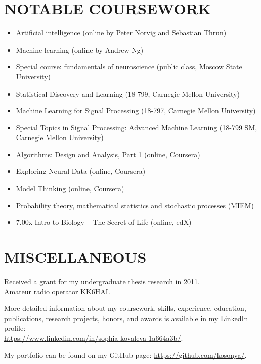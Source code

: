 \documentclass{res}
\begin{document}
\begin{resume}
\section{NOTABLE COURSEWORK}          
 
\begin{itemize}
	\item
		Artificial intelligence (online by Peter Norvig and Sebastian Thrun)
	\item
		Machine learning (online by Andrew Ng)
	\item
		Special course: fundamentals of neuroscience (public class, Moscow State University)
	\item
		Statistical Discovery and Learning (18-799, Carnegie Mellon University)
	\item
		Machine Learning for Signal Processing (18-797, Carnegie Mellon University)
	\item
		Special Topics in Signal Processing: Advanced Machine Learning (18-799 SM, Carnegie Mellon University)
	\item
		Algorithms: Design and Analysis, Part 1 (online, Coursera)
	\item
		Exploring Neural Data (online, Coursera)
	\item
		Model Thinking (online, Coursera)
	\item
		Probability theory, mathematical statistics and stochastic processes  (MIEM)
	\item
		7.00x Intro to Biology -- The Secret of Life (online, edX)
\end{itemize}

\section{MISCELLANEOUS}

Received a grant for my undergraduate thesis research in 2011.\\
Amateur radio operator KK6HAI.

More detailed information about my coursework, skills, experience, education, publications, research projects, honors, and awards is available in my LinkedIn profile:\\ \href{https://www.linkedin.com/in/sophia-kovaleva-1a664a3b/}{https://www.linkedin.com/in/sophia-kovaleva-1a664a3b/}.

My portfolio can be found on my GitHub page: \href{https://github.com/kosonya/}{https://github.com/kosonya/}.

\end{resume}
\end{document}
